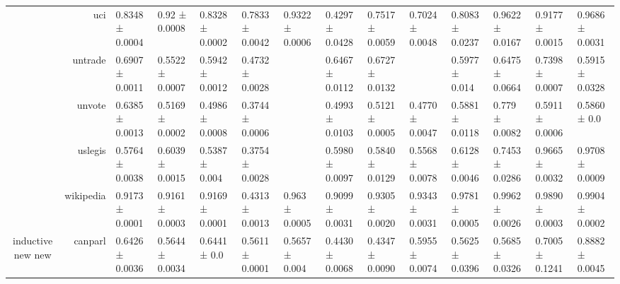 {\begin{tabular}{@{}crllllllllllll@{}}
                                    & uci                  & 0.8348 ± 0.0004           & 0.92 ± 0.0008              & 0.8328 ± 0.0002           & 0.7833 ± 0.0042            & \multicolumn{1}{l|}{0.9322 ± 0.0006} & 0.4297 ± 0.0428           & 0.7517 ± 0.0059           & 0.7024 ± 0.0048          & 0.8083 ± 0.0237         & 0.9622 ± 0.0167         & 0.9177 ± 0.0015          & 0.9686 ± 0.0031            \\
                                    & untrade              & 0.6907 ± 0.0011           & 0.5522 ± 0.0007            & 0.5942 ± 0.0012           & 0.4732 ± 0.0028            & \multicolumn{1}{l|}{}                & 0.6467 ± 0.0112           & 0.6727 ± 0.0132           &                          & 0.5977 ± 0.014          & 0.6475 ± 0.0664         & 0.7398 ± 0.0007          & 0.5915 ± 0.0328            \\
                                    & unvote               & 0.6385 ± 0.0013           & 0.5169 ± 0.0002            & 0.4986 ± 0.0008           & 0.3744 ± 0.0006            & \multicolumn{1}{l|}{}                & 0.4993 ± 0.0103           & 0.5121 ± 0.0005           & 0.4770 ± 0.0047          & 0.5881 ± 0.0118         & 0.779 ± 0.0082          & 0.5911 ± 0.0006          & 0.5860 ± 0.0               \\
                                    & uslegis              & 0.5764 ± 0.0038           & 0.6039 ± 0.0015            & 0.5387 ± 0.004            & 0.3754 ± 0.0028            & \multicolumn{1}{l|}{}                & 0.5980 ± 0.0097           & 0.5840 ± 0.0129           & 0.5568 ± 0.0078          & 0.6128 ± 0.0046         & 0.7453 ± 0.0286         & 0.9665 ± 0.0032          & 0.9708 ± 0.0009            \\
                                    & wikipedia            & 0.9173 ± 0.0001           & 0.9161 ± 0.0003            & 0.9169 ± 0.0001           & 0.4313 ± 0.0013            & \multicolumn{1}{l|}{0.963 ± 0.0005}  & 0.9099 ± 0.0031           & 0.9305 ± 0.0020           & 0.9343 ± 0.0031          & 0.9781 ± 0.0005         & 0.9962 ± 0.0026         & 0.9890 ± 0.0003          & 0.9904 ± 0.0002            \\
\multirow{15}{*}{inductive new new} & canparl              & 0.6426 ± 0.0036           & 0.5644 ± 0.0034            & 0.6441 ± 0.0              & 0.5611 ± 0.0001            & \multicolumn{1}{l|}{0.5657 ± 0.004}  & 0.4430 ± 0.0068           & 0.4347 ± 0.0090           & 0.5955 ± 0.0074          & 0.5625 ± 0.0396         & 0.5685 ± 0.0326         & 0.7005 ± 0.1241          & 0.8882 ± 0.0045            \\

\end{tabular}}
